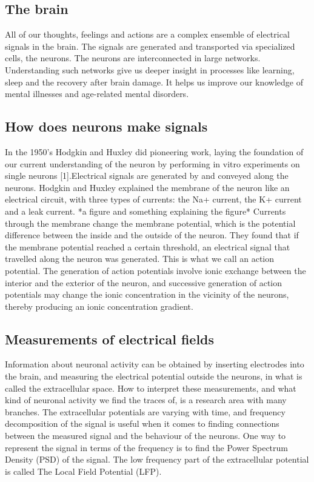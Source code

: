 \documentclass{article}
\begin{document}
\subsection{The brain}
All of our thoughts, feelings and actions are a complex ensemble of electrical signals in the brain. The signals are generated and transported via specialized cells, the neurons. The neurons are interconnected in large networks. Understanding such networks give us deeper insight in processes like learning, sleep and the recovery after brain damage. It helps us improve our knowledge of mental illnesses and age-related mental disorders.
\subsection{How does neurons make signals}
In the 1950’s Hodgkin and Huxley did pioneering work, laying the foundation of our current understanding of the neuron by performing in vitro experiments on single neurons [1].Electrical signals are generated by and conveyed along the neurons. Hodgkin and Huxley explained the membrane of the neuron like an electrical circuit, with three types of currents: the Na+ current, the K+ current and a leak current. *a figure and something explaining the figure* Currents through the membrane change the membrane potential, which is the potential difference between the inside and the outside of the neuron. They found that if the membrane potential reached a certain threshold, an electrical signal that travelled along the neuron was generated. This is what we call an action potential. The generation of action potentials involve ionic exchange between the interior and the exterior of the neuron, and successive generation of action potentials may change the ionic concentration in the vicinity of the neurons, thereby producing an ionic concentration gradient.
\subsection{Measurements of electrical fields}
Information about neuronal activity can be obtained by inserting electrodes into the brain, and measuring the electrical potential outside the neurons, in what is called the extracellular space. How to interpret these measurements, and what kind of neuronal activity we find the traces of, is a research area with many branches. The extracellular potentials are varying with time, and frequency decomposition of the signal is useful when it comes to finding connections between the measured signal and the behaviour of the neurons. One way to represent the signal in terms of the frequency is to find the Power Spectrum Density (PSD) of the signal. The low frequency part of the extracellular potential is called The Local Field Potential (LFP). 
\end{document}
